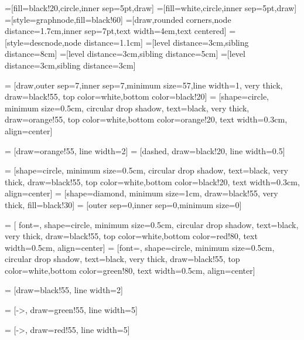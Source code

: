 \documentclass[10pt,a4paper,parskip]{scrbook}
\begin{document}


=[fill=black!20,circle,inner sep=5pt,draw]
=[fill=white,circle,inner sep=5pt,draw]
=[style=graphnode,fill=black!60]
=[draw,rounded corners,node distance=1.7cm,inner sep=7pt,text width=4em,text centered]
=[style=descnode,node distance=1.1cm]
=[level distance=3cm,sibling distance=8cm]
=[level distance=3cm,sibling distance=5cm]
=[level distance=3cm,sibling distance=3cm]
  


 = [draw,outer sep=7,inner sep=7,minimum size=57,line width=1, very thick, draw=black!55, top color=white,bottom color=black!20]
 = [shape=circle, minimum size=0.5cm, circular drop shadow, text=black, very thick, draw=orange!55, top color=white,bottom color=orange!20, text width=0.3cm, align=center]


 = [draw=orange!55, line width=2]
 = [dashed, draw=black!20, line width=0.5]



 = [shape=circle, minimum size=0.5cm, circular drop shadow, text=black, very thick, draw=black!55, top color=white,bottom color=black!20, text width=0.3cm, align=center]
 = [shape=diamond, minimum size=1cm, draw=black!55, very thick, fill=black!30]
 = [outer sep=0,inner sep=0,minimum size=0]

 = [  font={\huge\bfseries}, shape=circle, minimum size=0.5cm, circular drop shadow, text=black, very thick, draw=black!55, top color=white,bottom color=red!80, text width=0.5cm, align=center]
 = [font={\huge\bfseries}, shape=circle, minimum size=0.5cm, circular drop shadow, text=black, very thick, draw=black!55, top color=white,bottom color=green!80, text width=0.5cm, align=center]

 = [draw=black!55, line width=2]


 = [->, draw=green!55, line width=5]

 = [->, draw=red!55, line width=5]
\end{document}
